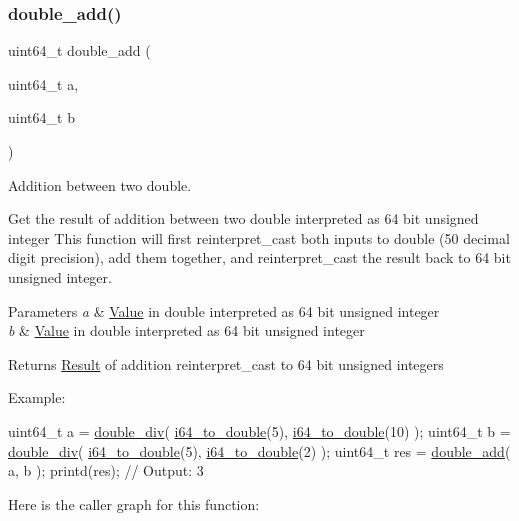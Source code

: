 \subsubsection{\texorpdfstring{double\+\_\+add()}{double\_add()}}
{\footnotesize\ttfamily uint64\+\_\+t double\+\_\+add (\begin{DoxyParamCaption}\item[{uint64\+\_\+t}]{a,  }\item[{uint64\+\_\+t}]{b }\end{DoxyParamCaption})}



Addition between two double. 

Get the result of addition between two double interpreted as 64 bit unsigned integer This function will first reinterpret\+\_\+cast both inputs to double (50 decimal digit precision), add them together, and reinterpret\+\_\+cast the result back to 64 bit unsigned integer. 
\begin{DoxyParams}{Parameters}
{\em a} & \mbox{\hyperlink{struct_value}{Value}} in double interpreted as 64 bit unsigned integer \\
\hline
{\em b} & \mbox{\hyperlink{struct_value}{Value}} in double interpreted as 64 bit unsigned integer \\
\hline
\end{DoxyParams}
\begin{DoxyReturn}{Returns}
\mbox{\hyperlink{struct_result}{Result}} of addition reinterpret\+\_\+cast to 64 bit unsigned integers
\end{DoxyReturn}
Example\+: 
\begin{DoxyCode}
uint64\_t a = \mbox{\hyperlink{group__mathcapi_gad67af06a6b0e9dbbf3be05d6bf99257c}{double\_div}}( \mbox{\hyperlink{group__mathcapi_gaec506d4ee77526e67ab5f2a8ef54f2b5}{i64\_to\_double}}(5), \mbox{\hyperlink{group__mathcapi_gaec506d4ee77526e67ab5f2a8ef54f2b5}{i64\_to\_double}}(10) );
uint64\_t b = \mbox{\hyperlink{group__mathcapi_gad67af06a6b0e9dbbf3be05d6bf99257c}{double\_div}}( \mbox{\hyperlink{group__mathcapi_gaec506d4ee77526e67ab5f2a8ef54f2b5}{i64\_to\_double}}(5), \mbox{\hyperlink{group__mathcapi_gaec506d4ee77526e67ab5f2a8ef54f2b5}{i64\_to\_double}}(2) );
uint64\_t res = \mbox{\hyperlink{group__mathcapi_ga7372b74e4cb87455342d39bdf3724811}{double\_add}}( a, b );
printd(res); \textcolor{comment}{// Output: 3}
\end{DoxyCode}
 Here is the caller graph for this function\+:
\mbox{\label{group__mathcapi_gad67af06a6b0e9dbbf3be05d6bf99257c}} 
